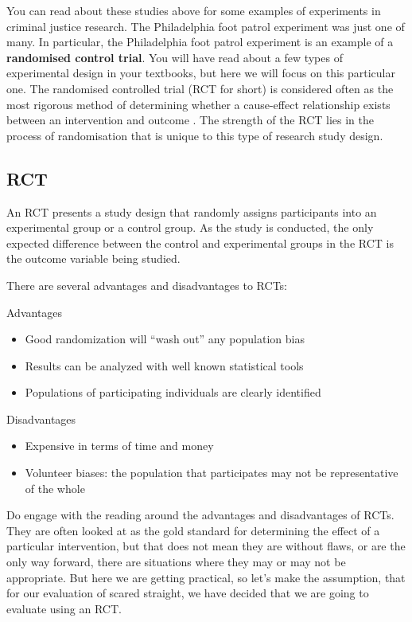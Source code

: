 \documentclass[]{book}
\providecommand{\tightlist}{%
  \setlength{\itemsep}{0pt}\setlength{\parskip}{0pt}}
\theoremstyle{definition}
\theoremstyle{definition}
\theoremstyle{definition}
\theoremstyle{remark}
\begin{document}
You can read about these studies above for some examples of experiments
in criminal justice research. The Philadelphia foot patrol experiment
was just one of many. In particular, the Philadelphia foot patrol
experiment is an example of a \textbf{randomised control trial}. You
will have read about a few types of experimental design in your
textbooks, but here we will focus on this particular one. The randomised
controlled trial (RCT for short) is considered often as the most
rigorous method of determining whether a cause-effect relationship
exists between an intervention and outcome . The strength of the RCT
lies in the process of randomisation that is unique to this type of
research study design.

\hypertarget{rct}{%
\subsection{RCT}\label{rct}}

An RCT presents a study design that randomly assigns participants into
an experimental group or a control group. As the study is conducted, the
only expected difference between the control and experimental groups in
the RCT is the outcome variable being studied.

There are several advantages and disadvantages to RCTs:

Advantages

\begin{itemize}
\tightlist
\item
  Good randomization will ``wash out'' any population bias
\item
  Results can be analyzed with well known statistical tools
\item
  Populations of participating individuals are clearly identified
\end{itemize}

Disadvantages

\begin{itemize}
\tightlist
\item
  Expensive in terms of time and money
\item
  Volunteer biases: the population that participates may not be
  representative of the whole
\end{itemize}

Do engage with the reading around the advantages and disadvantages of
RCTs. They are often looked at as the gold standard for determining the
effect of a particular intervention, but that does not mean they are
without flaws, or are the only way forward, there are situations where
they may or may not be appropriate. But here we are getting practical,
so let's make the assumption, that for our evaluation of scared
straight, we have decided that we are going to evaluate using an RCT.
\end{document}
